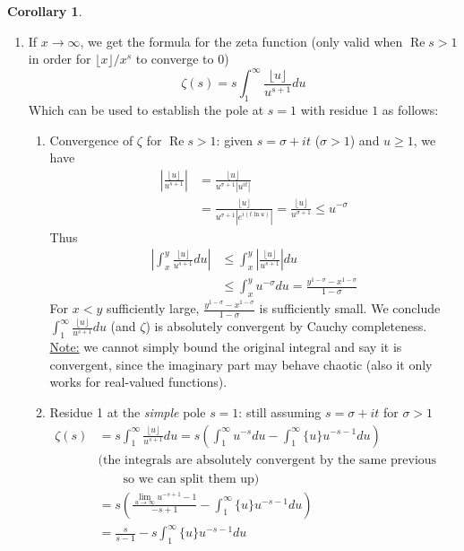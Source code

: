 \documentclass{article}
\theoremstyle{definition}
\newtheorem{corollary}[theorem]{Corollary}
\begin{document}
\begin{shaded}
\begin{corollary}
\begin{enumerate}
	\item If $x \to \infty$, we get the formula for the zeta function (only valid when $\operatorname{Re} s > 1$ in order for $\lfloor x \rfloor/x^s$ to converge to 0)
	$$\zeta(s) = s \int_1^\infty \frac{\lfloor u \rfloor}{u^{s + 1}} du$$
	Which can be used to establish the pole at $s = 1$ with residue $1$ as follows:
	\begin{enumerate}
		\item Convergence of $\zeta$ for $\operatorname{Re} s > 1$: given $s = \sigma + it$ ($\sigma > 1$) and $u \geq 1$, we have
		\begin{align*}
		\left| \frac{\lfloor u \rfloor}{u^{s + 1}} \right| & = \frac{\lfloor u \rfloor}{u^{\sigma + 1} |u^{it}|}
		\\
		& = \frac{\lfloor u \rfloor}{u^{\sigma + 1} |e^{i(t \ln u)}|} = \frac{\lfloor u \rfloor}{u^{\sigma + 1}} \leq u^{-\sigma}
		\end{align*}
		Thus
		\begin{align*}
		\left| \int_x^y \frac{\lfloor u \rfloor}{u^{s + 1}} du \right| & \leq \int_x^y \left| \frac{\lfloor u \rfloor}{u^{s + 1}} \right| du
		\\
		& \leq \int_x^y u^{-\sigma} du = \frac{y^{1 - \sigma} - x^{1 - \sigma}}{1 - \sigma}
		\end{align*}
		For $x < y$ sufficiently large, $\frac{y^{1 - \sigma} - x^{1 - \sigma}}{1 - \sigma}$ is sufficiently small. We conclude $\int_1^\infty \frac{\lfloor u \rfloor}{u^{s + 1}} du$ (and $\zeta$) is absolutely convergent by Cauchy completeness.
		\\
		\underline{Note:} we cannot simply bound the original integral and say it is convergent, since the imaginary part may behave chaotic (also it only works for real-valued functions).
		\item Residue 1 at the \textit{simple} pole $s = 1$: still assuming $s = \sigma+it$ for $\sigma > 1$
		\begin{align*}
		\zeta(s) & = s \int_1^\infty \frac{\lfloor u \rfloor}{u^{s + 1}} du = s \left( \int_1^\infty u^{-s} du - \int_1^\infty \{ u \} u^{-s-1} du \right)
		\\
		& \mbox{(the integrals are absolutely convergent by the same previous method,}
		\\
		& \qquad \mbox{so we can split them up)}
		\\
		& = s \left( \frac{\lim_{u \to \infty} u^{-s+1}-1}{-s+1} - \int_1^\infty \{ u \} u^{-s-1} du \right)
		\\
		& = \frac{s}{s - 1} - s \int_1^\infty \{ u \} u^{-s-1} du

\end{align*}
\end{enumerate}
\end{enumerate}
\end{corollary}
\end{shaded}
\end{document}
